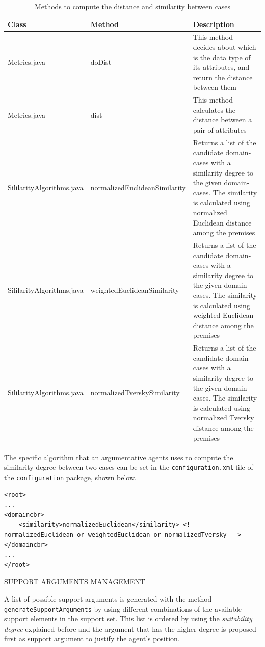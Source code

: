 \begin{table}[h!t]
\begin{tabulary}{1\linewidth}{|@{~}l|@{~}l|@{~}L|}
\hline
\textbf{Class} & \textbf{Method} & \textbf{Description} \\
\hline
Metrics.java & doDist & This method decides about which is the data type of its attributes, and return the distance between them\\
\hline
Metrics.java & dist & This method calculates the distance between a pair of attributes\\
\hline
SililarityAlgorithms.java & normalizedEuclideanSimilarity & Returns a list of the candidate domain-cases with a similarity degree to the given domain-cases. The similarity is calculated using normalized Euclidean distance among the premises\\
\hline
SililarityAlgorithms.java & weightedEuclideanSimilarity & Returns a list of the candidate domain-cases with a similarity degree to the given domain-cases. The similarity is calculated using weighted Euclidean distance among the premises\\
\hline
SililarityAlgorithms.java & normalizedTverskySimilarity & Returns a list of the candidate domain-cases with a similarity degree to the given domain-cases. The similarity is calculated using normalized Tversky distance among the premises\\
\hline
\end{tabulary}
\caption{Methods to compute the distance and similarity between cases}
\label{tab:algorithms}
\end{table}

The specific algorithm that an argumentative agents uses to compute the similarity degree between two cases can be set in the \lstinline{configuration.xml} file of the \texttt{configuration} package, shown below.

\begin{lstlisting}
<root>
...
<domaincbr>
	<similarity>normalizedEuclidean</similarity> <!-- normalizedEuclidean or weightedEuclidean or normalizedTversky -->
</domaincbr>
...
</root>
\end{lstlisting}

\underline{SUPPORT ARGUMENTS MANAGEMENT}

A list of possible support arguments is generated with the method \lstinline{generateSupportArguments} by using different combinations of the available support elements in the support set. This list is ordered by using the \emph{suitability degree} explained before and the argument that has the higher degree is proposed first as support argument to justify the agent's position.

